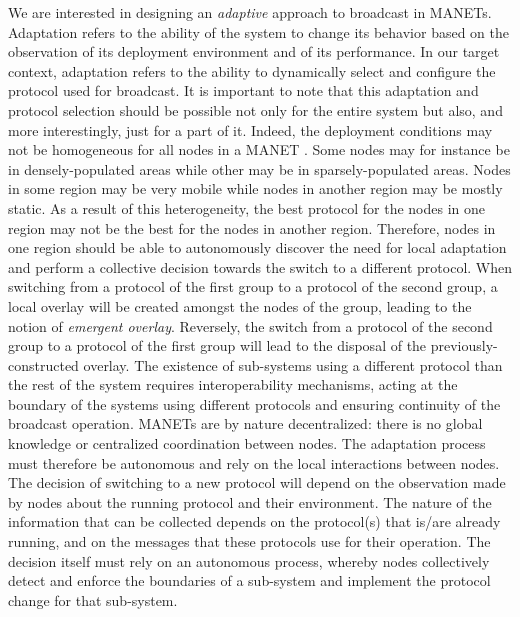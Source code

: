 We are interested in designing an \emph{adaptive} approach to broadcast in MANETs.
Adaptation refers to the ability of the system to change its behavior based on the observation of its deployment environment and of its performance.
In our target context, adaptation refers to the ability to dynamically select and configure the protocol used for broadcast.
It is important to note that this adaptation and protocol selection should be possible not only for the entire system but also, and more interestingly, just for a part of it.
Indeed, the deployment conditions may not be homogeneous for all nodes in a MANET .
Some nodes may for instance be in densely-populated areas while other may be in sparsely-populated areas.
Nodes in some region may be very mobile while nodes in another region may be mostly static.
As a result of this heterogeneity, the best protocol for the nodes in one region may not be the best for the nodes in another region.
Therefore, nodes in one region should be able to autonomously discover the need for local adaptation and perform a collective decision towards the switch to a different protocol.
When switching from a protocol of the first group to a protocol of the second group, a local overlay will be created amongst the nodes of the group, leading to the notion of \emph{emergent overlay}.
Reversely, the switch from a protocol of the second group to a protocol of the first group will lead to the disposal of the previously-constructed overlay.
%
The existence of sub-systems using a different protocol than the rest of the system requires interoperability mechanisms, acting at the boundary of the systems using different protocols and ensuring continuity of the broadcast operation.
%
MANETs are by nature decentralized: there is no global knowledge or centralized coordination between nodes.
The adaptation process must therefore be autonomous and rely on the local interactions between nodes.
The decision of switching to a new protocol will depend on the observation made by nodes about the running protocol and their environment.
The nature of the information that can be collected depends on the protocol(s) that is/are already running, and on the messages that these protocols use for their operation.
The decision itself must rely on an autonomous process, whereby nodes collectively detect and enforce the boundaries of a sub-system and implement the protocol change for that sub-system.

